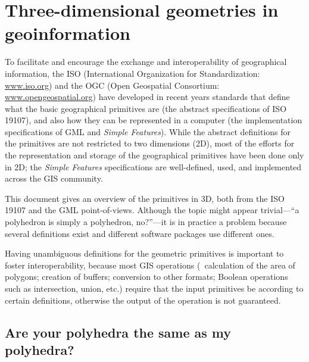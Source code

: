
\setchapterpreamble[u]{\margintoc}

\graphicspath{{iso19107/}}

\chapter{Three-dimensional geometries in geoinformation}%
\label{chap:iso19107}

To facilitate and encourage the exchange and interoperability of geographical information, the ISO (International Organization for Standardization: \url{www.iso.org}) and the OGC (Open Geospatial Consortium: \url{www.opengeospatial.org}) have developed in recent years standards that define what the basic geographical primitives are (the abstract specifications of ISO 19107), and also how they can be represented in a computer (the implementation specifications of GML and \emph{Simple Features}). 
While the abstract definitions for the primitives are not restricted to two dimensions (2D), most of the efforts for the representation and storage of the geographical primitives have been done only in 2D; the \emph{Simple Features} specifications are well-defined, used, and implemented across the GIS community.

This document gives an overview of the primitives in 3D, both from the ISO 19107 and the GML point-of-views.
Although the topic might appear trivial---``a polyhedron is simply a polyhedron, no?''---it is in practice a problem because several definitions exist and different software packages use different ones.

Having unambiguous definitions for the geometric primitives is important to foster interoperability, because most GIS operations (\eg\ calculation of the area of polygons; creation of buffers; conversion to other formats; Boolean operations such as intersection, union, etc.) require that the input primitives be according to certain definitions, otherwise the output of the operation is not guaranteed.

%
\section[Same polyhedra?]{Are your polyhedra the same as my polyhedra?}%
\label{sec:definition}


